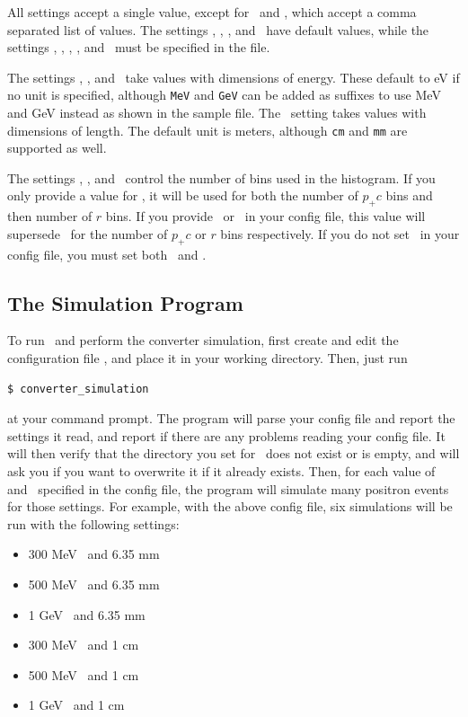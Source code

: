 \documentclass[12pt]{article}
\begin{document}
All settings accept a single value, except for \pcin \, and \targett, which accept a comma separated list of values.
The settings \outpcmin, \outdir, \numbins, and \fitxpt \, have default values, while the settings \targetm, \targett, \pcin, \outpcmax, and \dxydsmax \, must be specified in the file.

The settings \pcin, \outpcmin, and \outpcmax \, take values with dimensions of energy.
These default to eV if no unit is specified, although \texttt{MeV} and \texttt{GeV} can be added as suffixes to use MeV and GeV instead as shown in the sample file.
The \targett \, setting takes values with dimensions of length.
The default unit is meters, although \texttt{cm} and \texttt{mm} are supported as well.

The settings \numbins, \numpcbins, and \numrbins \, control the number of bins used in the histogram.
If you only provide a value for \numbins, it will be used for both the number of $p_+c$ bins and then number of $r$ bins.
If you provide \numpcbins \, or \numrbins \, in your config file, this value will supersede \numbins \, for the number of $p_+ c$ or $r$ bins respectively.
If you do not set \numbins \, in your config file, you must set both \numpcbins \, and \numrbins.

\subsection{The Simulation Program}

To run \exes \, and perform the converter simulation, first create and edit the configuration file \configfile, and place it in your working directory.
Then, just run
\begin{verbatim}
$ converter_simulation
\end{verbatim}
at your command prompt.
The program will parse your config file and report the settings it read, and report if there are any problems reading your config file.
It will then verify that the directory you set for \outdir \, does not exist or is empty, and will ask you if you want to overwrite it if it already exists.
Then, for each value of \pcin \, and \targett \, specified in the config file, the program will simulate many positron events for those settings.
For example, with the above config file, six simulations will be run with the following settings:
\begin{itemize}
\item
300 MeV \pcin \, and 6.35 mm \targett

\item
500 MeV \pcin \, and 6.35 mm \targett

\item
1 GeV \pcin \, and 6.35 mm \targett

\item
300 MeV \pcin \, and 1 cm \targett

\item
500 MeV \pcin \, and 1 cm \targett

\item
1 GeV \pcin \, and 1 cm \targett
\end{itemize}
\end{document}
